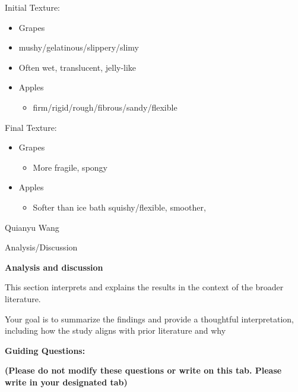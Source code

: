 Initial Texture:

\begin{itemize}
\item
  Grapes
\end{itemize}

\begin{itemize}
\item
  mushy/gelatinous/slippery/slimy
\item
  Often wet, translucent, jelly-like
\end{itemize}

\begin{itemize}
\item
  Apples

  \begin{itemize}
  \item
    firm/rigid/rough/fibrous/sandy/flexible
  \end{itemize}
\end{itemize}

Final Texture:

\begin{itemize}
\item
  Grapes

  \begin{itemize}
  \item
    More fragile, spongy
  \end{itemize}
\item
  Apples

  \begin{itemize}
  \item
    Softer than ice bath squishy/flexible, smoother,
  \end{itemize}
\end{itemize}

Quianyu Wang

Analysis/Discussion

\textbf{Analysis and discussion}

This section interprets and explains the results in the context of the
broader literature.

Your goal is to summarize the findings and provide a thoughtful
interpretation, including how the study aligns with prior literature and
why

\textbf{Guiding Questions:}

\textbf{(Please do not modify these questions or write on this tab.
Please write in your designated tab)}

